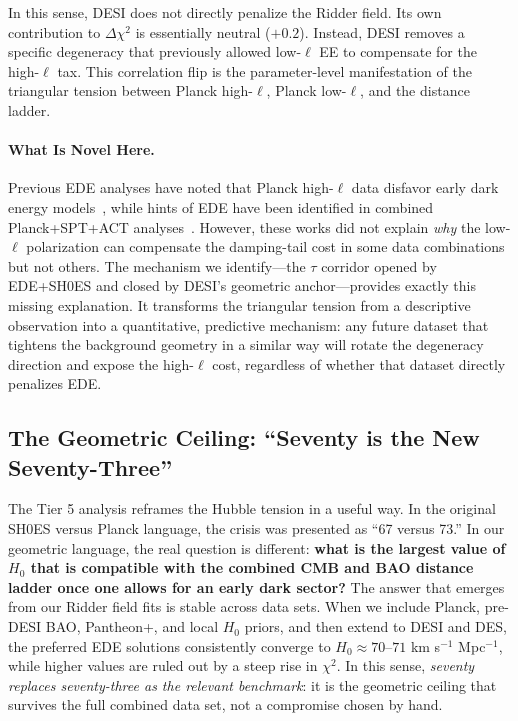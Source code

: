 \documentclass[a4paper,11pt]{article}
\begin{document}
In this sense, DESI does not directly penalize the Ridder field. Its own contribution to $\Delta\chi^2$ is essentially neutral ($+0.2$). Instead, DESI removes a specific degeneracy that previously allowed low-$\ell$ EE to compensate for the high-$\ell$ tax. This correlation flip is the parameter-level manifestation of the triangular tension between Planck high-$\ell$, Planck low-$\ell$, and the distance ladder.

\paragraph{What Is Novel Here.}
Previous EDE analyses have noted that Planck high-$\ell$ data disfavor early dark energy models~\cite{Hill2020,Ivanov2020}, while hints of EDE have been identified in combined Planck+SPT+ACT analyses~\cite{Schoneberg_hints,Smith2022}. However, these works did not explain \emph{why} the low-$\ell$ polarization can compensate the damping-tail cost in some data combinations but not others. The mechanism we identify---the $\tau$ corridor opened by EDE+SH0ES and closed by DESI's geometric anchor---provides exactly this missing explanation. It transforms the triangular tension from a descriptive observation into a quantitative, predictive mechanism: any future dataset that tightens the background geometry in a similar way will rotate the degeneracy direction and expose the high-$\ell$ cost, regardless of whether that dataset directly penalizes EDE.

\subsection*{The Geometric Ceiling: ``Seventy is the New Seventy-Three''}

The Tier 5 analysis reframes the Hubble tension in a useful way. In the original SH0ES versus Planck language, the crisis was presented as ``67 versus 73.'' In our geometric language, the real question is different: \textbf{what is the largest value of $H_0$ that is compatible with the combined CMB and BAO distance ladder once one allows for an early dark sector?} The answer that emerges from our Ridder field fits is stable across data sets. When we include Planck, pre-DESI BAO, Pantheon+, and local $H_0$ priors, and then extend to DESI and DES, the preferred EDE solutions consistently converge to $H_0 \approx 70$--$71$ km s$^{-1}$ Mpc$^{-1}$, while higher values are ruled out by a steep rise in $\chi^2$. In this sense, \emph{seventy replaces seventy-three as the relevant benchmark}: it is the geometric ceiling that survives the full combined data set, not a compromise chosen by hand.
\end{document}
